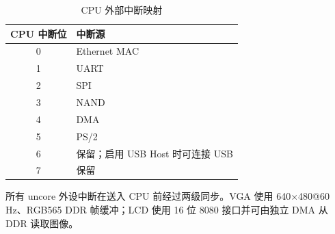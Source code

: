 \begin{table}[H]
\centering
\caption{CPU 外部中断映射}
\label{tab:interrupt}
\small
\begin{tabular}{cl}
\toprule
CPU 中断位 & 中断源 \\
\midrule
0 & Ethernet MAC \\
1 & UART \\
2 & SPI \\
3 & NAND \\
4 & DMA \\
5 & PS/2 \\
6 & 保留；启用 USB Host 时可连接 USB \\
7 & 保留 \\
\bottomrule
\end{tabular}
\end{table}

所有 uncore 外设中断在送入 CPU 前经过两级同步。VGA 使用 640$\times$480@60\,Hz、RGB565 DDR 帧缓冲；LCD 使用 16 位 8080 接口并可由独立 DMA 从 DDR 读取图像。
